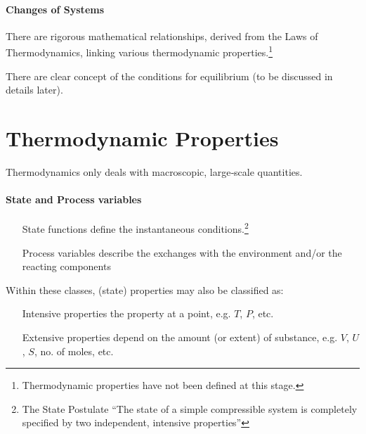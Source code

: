 \documentclass[UTF8]{book}
\begin{document}
\paragraph{Changes of Systems}
There are rigorous mathematical
relationships, derived from the Laws of
Thermodynamics, linking various
thermodynamic properties.\footnote{Thermodynamic properties have not been defined at
this stage.}

There are clear concept of the conditions for
equilibrium (to be discussed in details later).

\section{Thermodynamic Properties}
Thermodynamics only deals with
macroscopic, large‐scale quantities.

\paragraph{State and Process variables}
\begin{itemize}
\item[State functions] define the instantaneous
conditions.\footnote{The State Postulate ``The state of a simple compressible system
is completely specified by two independent, intensive properties''}
\item[Process variables] describe the exchanges with
the environment and/or the reacting
components
\end{itemize}

Within these classes, (state) properties may also be
classified as:
\begin{itemize}
\item[Intensive properties] the property at a point, e.g. $T$, $P$, etc.
\item[Extensive properties] depend on the amount (or
extent) of substance, e.g. $V$, $U$, $S$, no. of moles, etc.
\end{itemize}
\end{document}
